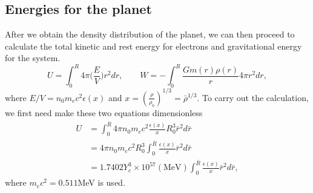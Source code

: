 \documentclass{article}
\begin{document}
\subsection{Energies for the planet}
After we obtain the density distribution of the planet, we can then proceed to calculate the total kinetic and rest energy for electrons and gravitational energy for the system.
\begin{equation}
U= \int_0^R 4\pi \big( \frac{E}{V} \big)r^2 dr,  \qquad    W=-\int_0^R\frac{Gm(r)\rho(r)}{r} 4\pi r^2 dr,
\end{equation}
where $E/V = n_0m_ec^2 \epsilon(x)$ and $x=(\frac{\rho}{\rho_0})^{1/3}=\bar{\rho}^{1/3}$.
To carry out the calculation, we first need make these two equations dimensionless
\begin{equation}
\begin{aligned}
U&=\int_0^{\bar{R}} 4\pi n_0 m_ec^2 \frac{\epsilon(x)}{x} R_0^3 \bar{r}^2 d\bar{r}\\
&=4\pi n_0 m_ec^2  R_0^3 \int_0^{\bar{R}}\frac{\epsilon(x)}{x}\bar{r}^2 d\bar{r} \\
&=1.7402 Y_e^3 \times 10^{57} (\text{MeV}) \int_0^{\bar{R}}\frac{\epsilon(x)}{x}\bar{r}^2 d\bar{r}  ,
\end{aligned}
\end{equation}
where $m_ec^2=0.511 $MeV is used.
\end{document}
